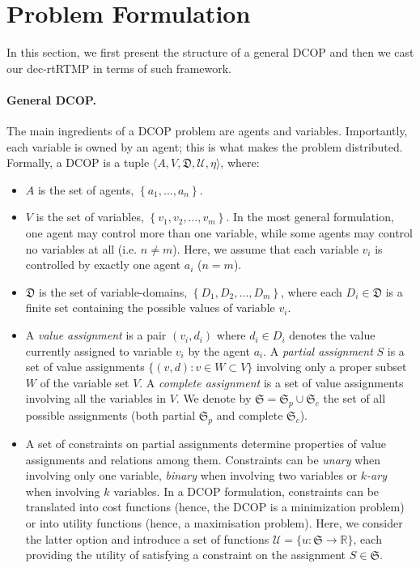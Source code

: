 \section{Problem Formulation}\label{sec:pf}

In this section, we first present the structure of a general DCOP and then we cast our dec-rtRTMP in terms of such framework.

\paragraph{General DCOP.} The main ingredients of a DCOP problem are agents and variables. Importantly, each variable is owned by an
agent; this is what makes the problem distributed. Formally, a DCOP is a tuple $\langle A, V, \mathfrak{D}, \mathcal{U}, \eta\rangle$, where:
\begin{itemize}

\item $A$ is the set of agents, $\left\{a_{1}, \ldots, a_{n}\right\}$.

\item $V$ is the set of variables, $\left\{v_{1}, v_{2}, \ldots, v_{m}\right\}$. In the most general formulation, one agent may control more than one variable, while some agents may control no variables at all (i.e. $n \neq m$). Here, we assume that each variable $v_i$ is controlled by exactly one agent $a_i$ ($n=m$).

\item $\mathfrak{D}$ is the set of variable-domains, $\left\{D_{1}, D_{2}, \ldots, D_{m}\right\}$, where each $D_{i} \in \mathfrak{D}$ is a finite set containing the possible values of variable $v_{i}$. 

\item A \emph{value assignment} is a pair $(v_i, d_i)$ where $d_{i} \in D_i$ denotes the value currently assigned to variable $v_i$ by the agent $a_i$. A \emph{partial assignment} $S$ is a set of value assignments $\{ (v, d): v \in W \subset V \}$ involving only a proper subset $W$ of the variable set $V$. A \emph{complete assignment} is a set of value assignments involving all the variables in $V$. We denote by $\mathfrak{S} = \mathfrak{S}_p \cup \mathfrak{S}_c$ the set of all possible assignments (both partial $\mathfrak{S}_p$ and complete $\mathfrak{S}_c$).

\item A set of constraints on partial assignments determine properties of value assignments and relations among them. Constraints can be \emph{unary} when involving only one variable, \emph{binary} when involving two variables or \emph{$k$-ary} when involving $k$ variables. In a DCOP formulation, constraints can be translated into cost functions (hence, the DCOP is a minimization problem) or into utility functions (hence, a maximisation problem). Here, we consider the latter option and introduce a set of functions $\mathcal{U} = \{u:\mathfrak{S} \rightarrow \mathbb{R}\}$, each providing the utility of satisfying a constraint on the assignment $S\in\mathfrak{S}$.


\end{itemize}
